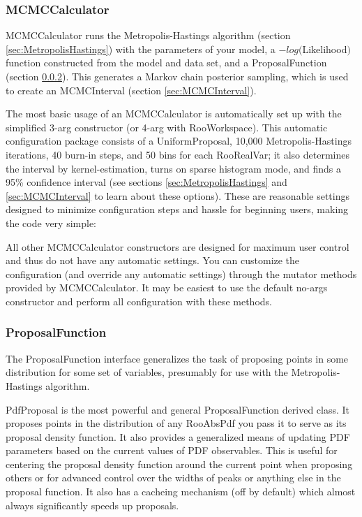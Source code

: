 \documentclass[11pt]{article}
\begin{document}
	\subsubsection{MCMCCalculator}
	\label{sec:MCMCCalculator}
	
	MCMCCalculator runs the Metropolis-Hastings algorithm (section \ref{sec:MetropolisHastings}) with the parameters of your model, a $-log($Likelihood$)$ function constructed from the model and data set, and a ProposalFunction (section \ref{sec:ProposalFunction}).  This generates a Markov chain posterior sampling, which is used to create an MCMCInterval (section \ref{sec:MCMCInterval}).
	
	The most basic usage of an MCMCCalculator is automatically set up with the simplified 3-arg constructor (or 4-arg with RooWorkspace).  This automatic configuration package consists of  a UniformProposal, 10,000 Metropolis-Hastings iterations, 40 burn-in steps, and 50 bins for each RooRealVar; it also determines the interval by kernel-estimation, turns on sparse histogram mode, and finds a 95\% confidence interval (see sections \ref{sec:MetropolisHastings} and \ref{sec:MCMCInterval} to learn about these options).  These are reasonable settings designed to minimize configuration steps and hassle for beginning users, making the code very simple:
	
	
	
	All other MCMCCalculator constructors are designed for maximum user control and thus do not have any automatic settings.  You can customize the configuration (and override any automatic settings) through the mutator methods provided by MCMCCalculator.  It may be easiest to use the default no-args constructor and perform all configuration with these methods.
	
	
	
	\subsubsection{ProposalFunction}
	\label{sec:ProposalFunction}
	The ProposalFunction interface generalizes the task of proposing points in some distribution for some set of variables, presumably for use with the Metropolis-Hastings algorithm.
	
	PdfProposal is the most powerful and general ProposalFunction derived class.  It proposes points in the distribution of any RooAbsPdf you pass it to serve as its proposal density function.  It also provides a generalized means of updating PDF parameters based on the current values of PDF observables.  This is useful for centering the proposal density function around the current point when proposing others or for advanced control over the widths of peaks or anything else in the proposal function.  It also has a cacheing mechanism (off by default) which almost always significantly speeds up proposals.
	
\end{document}
